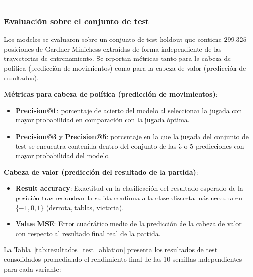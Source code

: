 \documentclass[12pt, a4paper]{article}
\begin{document}
\rule{\textwidth}{0.2pt}
\subsubsection{Evaluación sobre el conjunto de test}

Los modelos se evaluaron sobre un conjunto de test holdout que contiene $299.325$ posiciones de Gardner Minichess extraídas de forma independiente de las trayectorias de entrenamiento. Se reportan métricas tanto para la cabeza de política (predicción de movimientos) como para la cabeza de valor (predicción de resultados). 

\textbf{Métricas para cabeza de política (predicción de movimientos)}:
\begin{itemize}
    \item \textbf{Precision@1}: porcentaje de acierto del modelo al seleccionar la jugada con mayor probabilidad en comparación con la jugada óptima.
    \item \textbf{Precision@3} y \textbf{Precision@5}: porcentaje en la que la jugada del conjunto de test se encuentra contenida dentro del conjunto de las 3 o 5 predicciones con mayor probabilidad del modelo.
\end{itemize}
\textbf{Cabeza de valor (predicción del resultado de la partida)}:
\begin{itemize}
    \item \textbf{Result accuracy}: Exactitud en la clasificación del resultado esperado de la posición tras redondear la salida continua a la clase discreta más cercana en $\{-1, 0, 1\}$ (derrota, tablas, victoria).
    \item \textbf{Value MSE}: Error cuadrático medio de la predicción de la cabeza de valor con respecto al resultado final real de la partida.
\end{itemize}


La Tabla~\ref{tab:resultados_test_ablation} presenta los resultados de test consolidados promediando el rendimiento final de las 10 semillas independientes para cada variante:
\end{document}
